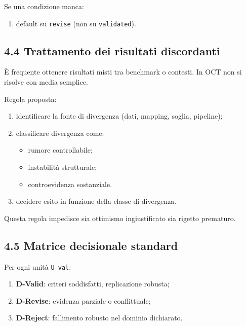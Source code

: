 Se una condizione manca:

\begin{enumerate}
\def\labelenumi{\arabic{enumi}.}
\tightlist
\item
  default su \texttt{revise} (non su \texttt{validated}).
\end{enumerate}

\subsection{4.4 Trattamento dei risultati discordanti}

È frequente ottenere risultati misti tra benchmark o contesti. In OCT non si risolve con media semplice.

Regola proposta:

\begin{enumerate}
\def\labelenumi{\arabic{enumi}.}
\tightlist
\item
  identificare la fonte di divergenza (dati, mapping, soglia, pipeline);
\item
  classificare divergenza come:

  \begin{itemize}
  \tightlist
  \item
    rumore controllabile;
  \item
    instabilità strutturale;
  \item
    controevidenza sostanziale.
  \end{itemize}
\item
  decidere esito in funzione della classe di divergenza.
\end{enumerate}

Questa regola impedisce sia ottimismo ingiustificato sia rigetto prematuro.

\subsection{4.5 Matrice decisionale standard}

Per ogni unità \texttt{U\_val}:

\begin{enumerate}
\def\labelenumi{\arabic{enumi}.}
\tightlist
\item
  \textbf{D-Valid}: criteri soddisfatti, replicazione robusta;
\item
  \textbf{D-Revise}: evidenza parziale o conflittuale;
\item
  \textbf{D-Reject}: fallimento robusto nel dominio dichiarato.
\end{enumerate}

